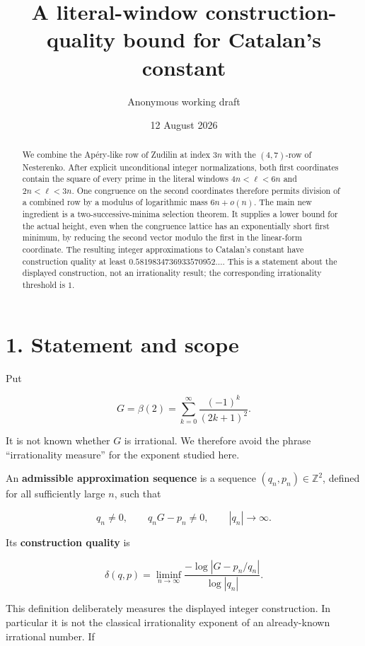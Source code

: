 \documentclass[
  11pt,
]{article}
\title{A literal-window construction-quality bound for Catalan's
constant}
\author{Anonymous working draft}
\date{12 August 2026}
\begin{document}
\maketitle
\begin{abstract}
We combine the Apéry-like row of Zudilin at index \(3n\) with the
\((4,7)\)-row of Nesterenko. After explicit unconditional integer
normalizations, both first coordinates contain the square of every prime
in the literal windows \(4n<\ell<6n\) and \(2n<\ell<3n\). One congruence
on the second coordinates therefore permits division of a combined row
by a modulus of logarithmic mass \(6n+o(n)\). The main new ingredient is
a two-successive-minima selection theorem. It supplies a lower bound for
the actual height, even when the congruence lattice has an exponentially
short first minimum, by reducing the second vector modulo the first in
the linear-form coordinate. The resulting integer approximations to
Catalan's constant have construction quality at least
\(0.5819834736933570952\ldots\). This is a statement about the displayed
construction, not an irrationality result; the corresponding
irrationality threshold is \(1\).
\end{abstract}

\hypertarget{statement-and-scope}{%
\section{1. Statement and scope}\label{statement-and-scope}}

Put

\[
 G=\beta(2)=\sum_{k=0}^{\infty}\frac{(-1)^k}{(2k+1)^2}.
\]

It is not known whether \(G\) is irrational. We therefore avoid the
phrase ``irrationality measure'' for the exponent studied here.

An \textbf{admissible approximation sequence} is a sequence
\((q_n,p_n)\in\mathbb Z^2\), defined for all sufficiently large \(n\),
such that

\[
 q_n\ne0,\qquad q_nG-p_n\ne0,\qquad |q_n|\longrightarrow\infty.
\]

Its \textbf{construction quality} is

\[
 \delta(q,p)=
 \liminf_{n\to\infty}
 \frac{-\log|G-p_n/q_n|}{\log|q_n|}.                 \tag{1.1}
\]

This definition deliberately measures the displayed integer
construction. In particular it is not the classical irrationality
exponent of an already-known irrational number. If
\end{document}
